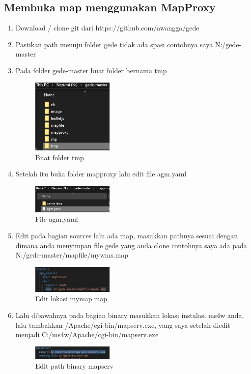 \subsection{Membuka map menggunakan MapProxy}
\begin{enumerate}
  \item Download / clone git dari https://github.com/awangga/gede
  \item Pastikan path menuju folder gede tidak ada spasi contohnya saya N:/gede-master
  \item Pada folder gede-master buat folder bernama tmp
  \hfill\break
  \begin{figure}[H]
  \includegraphics[width=4cm]{figures/tugas4/1174066/11.jpg}
  \centering
  \caption{Buat folder tmp}
  \end{figure}

  \item Setelah itu buka folder mapproxy lalu edit file agm.yaml
  \hfill\break
  \begin{figure}[H]
  \includegraphics[width=4cm]{figures/tugas4/1174066/13.jpg}
  \centering
  \caption{File agm.yaml}
  \end{figure}

  \item Edit pada bagian sources lalu ada map, masukkan pathnya sesuai dengan dimana anda menyimpan file gede yang anda clone contohnya saya ada pada N:/gede-master/mapfile/mywms.map
  \hfill\break
  \begin{figure}[H]
  \includegraphics[width=4cm]{figures/tugas4/1174066/14.jpg}
  \centering
  \caption{Edit lokasi mymap.map}
  \end{figure}


  \item Lalu dibawahnya pada bagian binary masukkan lokasi instalasi ms4w anda, lalu tambahkan /Apache/cgi-bin/mapserv.exe, yang saya setelah diedit menjadi C:/ms4w/Apache/cgi-bin/mapserv.exe
  \hfill\break
  \begin{figure}[H]
  \includegraphics[width=4cm]{figures/tugas4/1174066/15.jpg}
  \centering
  \caption{Edit path binary mapserv}
  \end{figure}


\end{enumerate}
